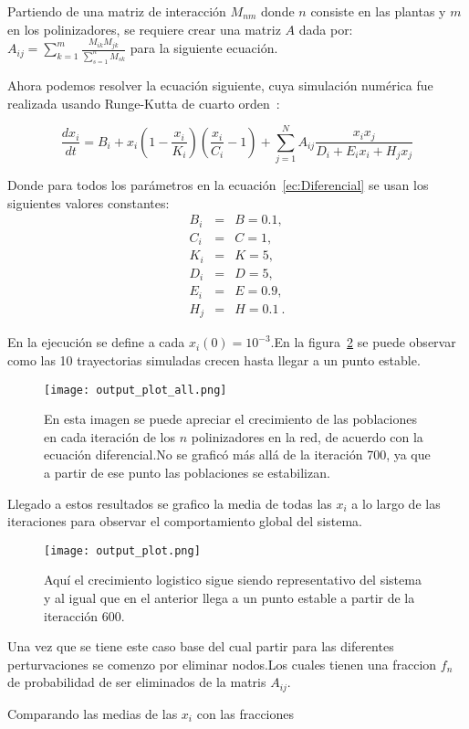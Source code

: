 \documentclass[11pt]{article}
\begin{document}
Partiendo de una matriz de interacción $M_{nm}$ donde $n$ consiste en las plantas y $m$ en los polinizadores, se requiere crear una matriz $A$ dada por: $
A_{ij}=\sum^m_{k=1}\frac{M_{ik}M_{jk}}{\sum^n_{s=1}M_{sk}}
$ para la siguiente ecuación.

Ahora podemos resolver la ecuación siguiente, cuya simulación numérica fue realizada usando Runge-Kutta de cuarto orden~\cite{numerical2002recipes}:

\begin{equation}
\label{ec:Diferencial}
\frac{dx_i}{dt} = B_{i}+x_{i}\left( 1-\frac{x_{i}}{K_{i}}\right ) \left(\frac{x_{i}}{C_{i}}-1\right)+\sum^N_{j=1}A_{ij}\frac{x_{i}x_{j}}{D_{i}+E_{i}x_{i}+H_{j}x_{j}}
\end{equation}


Donde para todos los parámetros en la ecuación~\eqref{ec:Diferencial} se usan los siguientes valores constantes:
\begin{eqnarray*}
B_{i}&=&B=0.1,\\
C_{i}&=&C=1,\\
K_{i}&=&K=5,\\ 
D_{i}&=&D=5,\\
E_{i}&=&E=0.9,\\
H_{j}&=&H=0.1\ .
\end{eqnarray*}

En la ejecución se define a cada $x_{i}(0)=10^{-3}$.En la figura~\ref{fig-sol} se puede observar como las 10 trayectorias simuladas crecen hasta llegar a un punto estable.

\begin{figure}[hb]
\label{fig-sol-all}
\texttt{[image: output\_plot\_all.png]}
\caption{En esta imagen se puede apreciar el crecimiento de las poblaciones en cada iteración de los $n$ polinizadores en la red, de acuerdo con la ecuación diferencial.No se graficó más allá de la iteración 700, ya que a partir de ese punto las poblaciones se estabilizan.}
\end{figure}

Llegado a estos resultados se grafico la media de todas las $x_i$ a lo largo de las iteraciones para observar el comportamiento global del sistema.

\begin{figure}[hb]
\label{fig-sol}
\texttt{[image: output\_plot.png]}
\caption{Aquí el crecimiento logistico sigue siendo representativo del sistema y al igual que en el anterior llega a un punto estable a partir de la iteracción 600.}
\end{figure}

Una vez que se tiene este caso base del cual partir para las diferentes perturvaciones se comenzo por eliminar nodos.Los cuales tienen una fraccion $f_{n}$ de probabilidad de ser eliminados de la matris $A_{ij}$.

Comparando las medias de las $x_{i}$ con las fracciones



        

 
\end{document}
